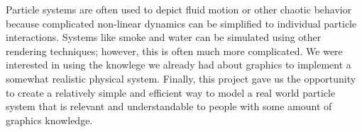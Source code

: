 Particle systems are often used to depict fluid motion or other chaotic behavior because complicated non-linear dynamics can be simplified to individual particle interactions. Systems like smoke and water can be simulated using other rendering techniques; however, this is often much more complicated. We were interested in using the knowlege we already had about graphics to implement a somewhat realistic physical system.  Finally, this project gave us the opportunity to create a relatively simple and efficient way to model a real world particle system that is relevant and understandable to people with some amount of graphics knowledge.  



